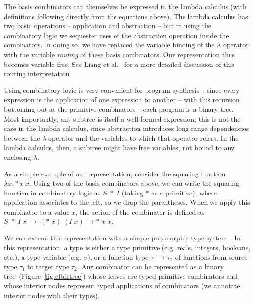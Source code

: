 \documentclass{article}
\begin{document}
The basis combinators can themselves be expressed in the lambda
calculus (with definitions following directly from the equations
above). The lambda calculus has two basic operations -- application
and abstraction -- but in using the
combinatory logic we sequester uses of the abstraction operation
inside the combinators. In doing so, we have replaced the variable
binding of the $\lambda$ operator with the variable \emph{routing} of
these basis combinators. Our representation thus becomes
variable-free. See Liang et al.~\cite{liang10programs} for a more
detailed discussion of this routing interpretation.

Using combinatory logic is very convenient for program
synthesis~\cite{briggs2006functional}: since every expression is the
application of one expression to another -- with this recursion
bottoming out at the primitive combinators -- each program is a binary
tree. Most importantly, any subtree is itself a well-formed
expression; this is not the case in the lambda calculus, since
abstraction introduces long range dependencies between the $\lambda$
operator and the variables to which that operator refers. In the
lambda calculus, then, a subtree might have free variables, not bound
to any enclosing $\lambda$.

As a simple example of our representation, consider the squaring
function $\lambda x. * x\; x $. Using two of the basis combinators
above, we can write the squaring function in combinatory logic as $S\; *\;
I$ (taking $*$ as a primitive), where application associates to the
left, so we drop the parentheses. When we apply this combinator to a
value $x$, the action of the combinator is defined as $S \;*\; I\;
x~\rightarrow~(*\; x)\; (I\; x)~\rightarrow *\; x \; x$.

We can extend this representation with a simple polymorphic type
system~\cite{Pierce_2002}. In this representation, a type is either a
type primitive (e.g. reals, integers, booleans, etc.), a type variable
(e.g. $\sigma$), or a function type $ \tau_1 \rightarrow \tau_2$ of
functions from source type $\tau_1$ to target type $\tau_2$. Any combinator
can be represented as a binary tree~(Figure~\ref{fig:clbintree}) whose
leaves are typed primitive combinators and whose interior nodes
represent typed applications of combinators (we annotate interior
nodes with their types).
\end{document}
